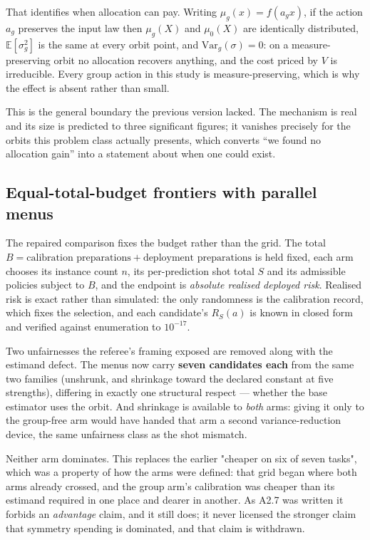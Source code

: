 \documentclass{article}
\begin{document}
That identifies when allocation can pay. Writing $\mu_g(x)=f(a_g x)$, if the action $a_g$ preserves
the input law then $\mu_g(X)$ and $\mu_0(X)$ are identically distributed, $\mathbb{E}[\sigma_g^2]$ is
the same at every orbit point, and $\mathrm{Var}_g(\sigma)=0$: on a measure-preserving orbit no
allocation recovers anything, and the cost priced by $V$ is irreducible. Every group action in this
study is measure-preserving, which is why the effect is absent rather than small.




This is the general boundary the previous version lacked. The mechanism is real and its size is
predicted to three significant figures; it vanishes precisely for the orbits this problem class
actually presents, which converts ``we found no allocation gain'' into a statement about when one
could exist.

\subsection{Equal-total-budget frontiers with parallel menus}
\label{sec:frontier}

The repaired comparison fixes the budget rather than the grid. The total
$B=\text{calibration preparations}+\text{deployment preparations}$ is held fixed, each arm chooses its
instance count $n$, its per-prediction shot total $S$ and its admissible policies subject to $B$, and the
endpoint is \emph{absolute realised deployed risk}. Realised risk is exact rather than simulated: the
only randomness is the calibration record, which fixes the selection, and each candidate's $R_S(a)$ is
known in closed form and verified against enumeration to $10^{-17}$.

Two unfairnesses the referee's framing exposed are removed along with the estimand defect. The menus now
carry \textbf{seven candidates each} from the same two families (unshrunk, and shrinkage toward the
declared constant at five strengths), differing in exactly one structural respect --- whether the base
estimator uses the orbit. And shrinkage is available to \emph{both} arms: giving it only to the
group-free arm would have handed that arm a second variance-reduction device, the same unfairness class
as the shot mismatch.




Neither arm dominates. This replaces the earlier "cheaper on six of seven tasks", which was a property
of how the arms were defined: that grid began where both arms already crossed, and the group arm's
calibration was cheaper than its estimand required in one place and dearer in another. As A2.7 was
written it forbids an \emph{advantage} claim, and it still does; it never licensed the stronger claim
that symmetry spending is dominated, and that claim is withdrawn.
\end{document}
